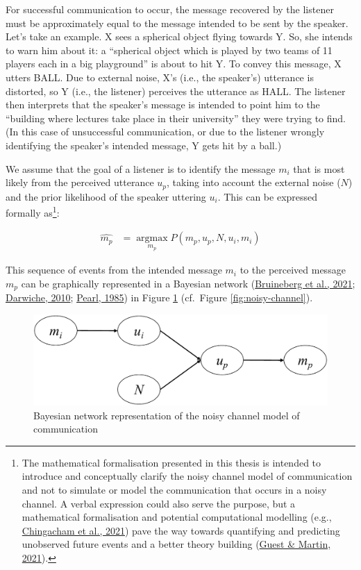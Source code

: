 \documentclass[a4paper, nobind]{templates/ociamthesis}
\begin{document}
For successful communication to occur, the message recovered by the listener must be approximately equal to the message intended to be sent by the speaker.
Let's take an example.
X sees a spherical object flying towards Y.
So, she intends to warn him about it: a ``spherical object which is played by two teams of 11 players each in a big playground'' is about to hit Y.
To convey this message, X utters BALL.
Due to external noise, X's (i.e., the speaker's) utterance is distorted, so Y (i.e., the listener) perceives the utterance as HALL.
The listener then interprets that the speaker's message is intended to point him to the ``building where lectures take place in their university'' they were trying to find.
(In this case of unsuccessful communication, or due to the listener wrongly identifying the speaker's intended message, Y gets hit by a ball.)

We assume that the goal of a listener is to identify the message \(m_i\) that is most likely from the perceived utterance \(u_p\), taking into account the external noise (\(N\)) and the prior likelihood of the speaker uttering \(u_i\).
This can be expressed formally as\footnote{The mathematical formalisation presented in this thesis is intended to introduce and conceptually clarify the noisy channel model of communication and not to simulate or model the communication that occurs in a noisy channel.
  A verbal expression could also serve the purpose, but a mathematical formalisation and potential computational modelling (e.g., \protect\hyperlink{ref-Chingacham2021}{Chingacham et al., 2021}) pave the way towards quantifying and predicting unobserved future events and a better theory building (\protect\hyperlink{ref-Guest2020}{Guest \& Martin, 2021}).
}:

\begin{align} \label{eq:noisy-channel2}
\hat{m_p} &= \mathop{\mathrm{argmax}}\limits_{m_p} P(m_p,u_p,N,u_i,m_i)
\end{align}

This sequence of events from the intended message \(m_i\) to the perceived message \(m_p\) can be graphically represented in a Bayesian network (\protect\hyperlink{ref-Bruineberg2021}{Bruineberg et al., 2021}; \protect\hyperlink{ref-Darwiche2010}{Darwiche, 2010}; \protect\hyperlink{ref-Pearl1985}{Pearl, 1985}) in Figure \ref{fig:bayesian-network} (cf.~Figure \ref{fig:noisy-channel}).

\begin{figure}[!htpb]

{\centering \includegraphics[width=0.9\linewidth]{figures/materials/bayesian-network} 

}

\caption{Bayesian network representation of the noisy channel model of communication}\label{fig:bayesian-network}
\end{figure}
\end{document}
